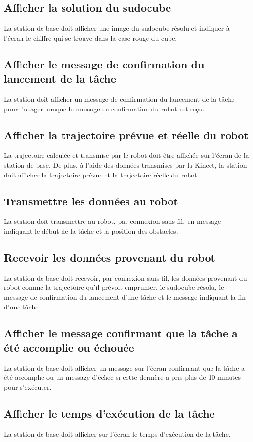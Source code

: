 \subsection{Afficher la solution du sudocube}
La station de base doit afficher une image du sudocube résolu et indiquer à l'écran le chiffre qui se trouve dans la case rouge du cube.
\subsection{Afficher le message de confirmation du lancement de la tâche}
La station doit afficher un message de confirmation du lancement de la tâche pour l'usager lorsque le message de confirmation du robot est reçu.
\subsection{Afficher la trajectoire prévue et réelle du robot}
La trajectoire calculée et transmise par le robot doit être affichée sur l'écran de la station de base. De plus, à l'aide des données transmises par la Kinect, la station doit afficher la trajectoire prévue et la trajectoire réelle du robot.
\subsection{Transmettre les données au robot}
La station doit transmettre au robot, par connexion sans fil, un message indiquant le début de la tâche et la position des obstacles.
\subsection{Recevoir les données provenant du robot}
La station de base doit recevoir, par connexion sans fil, les données provenant du robot comme la trajectoire qu’il prévoit emprunter, le sudocube résolu, le message de confirmation du lancement d'une tâche et le message indiquant la fin d'une tâche.
\subsection{Afficher le message confirmant que la tâche a été accomplie ou échouée}
La station de base doit afficher un message sur l'écran confirmant que la tâche a été accomplie ou un message d'échec si cette dernière a pris plus de 10 minutes pour s'exécuter.
\subsection{Afficher le temps d'exécution de la tâche}
La station de base doit afficher sur l'écran le temps d'exécution de la tâche.
